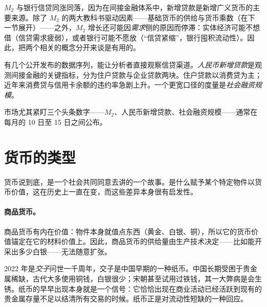 $M_2$ 与银行信贷同涨同落，因为在间接金融体系中，新增贷款是新增广义货币的主要来源。除了 $M_2$ 的两大教科书驱动因素——基础货币的供给与货币乘数（在下一节展开）——之外，$M_2$ 增长还可能因\emph{需求}侧的原因而停滞：实体经济可能不想借（信贷需求疲弱），或者银行可能不愿放（“信贷紧缩”，银行囤积流动性）。因此，把两个相关的概念分开来谈是有用的。


有几个公开发布的数据序列，能让分析者直接观察信贷渠道。\emph{人民币新增贷款}是观测间接金融的关键指标，分为住户贷款与企业贷款两块。住户贷款以消费贷为主；近年来消费贷与信用卡余额的违约率急剧上升。一个更宽口径的度量是\emph{社会融资规模}。


市场尤其紧盯三个头条数字——$M_2$、人民币新增贷款、社会融资规模——通常在每月的 10 日至 15 日之间公布。

\section{货币的类型}

货币说到底，是一个社会共同同意去讲的一个故事。是什么赋予某个特定物件以货币价值，这在历史上一直在变，而这些差异本身很有启发性。

\paragraph{商品货币。}商品货币有内在价值：物件本身就值点东西（黄金、白银、铜），所以它的货币价值锚定在它的材料价值上。因此，商品货币的供给量由生产技术决定——比如能开采出多少白银——无法随意扩张。

\begin{remark}[纸币比你想的要古老]
2022 年是\emph{交子}问世一千周年，交子是中国早期的一种纸币。中国长期受困于贵金属稀缺，古代大多使用铜钱，白银很少；宋朝甚至试用过铁钱，其一大弊病是会生锈。纸币的早早出现本身就是一个信号：它恰恰出现在商业活动已经活跃到现有的贵金属存量不足以结清所有交易的时候。纸币正是对流动性短缺的一种回应。
\end{remark}

